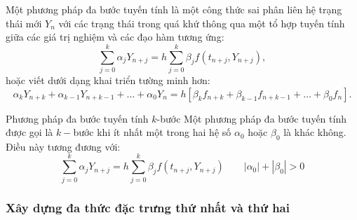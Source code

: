 Một phương pháp đa bước tuyến tính là một công thức sai phân liên hệ trạng thái mới $Y_{n}$ với các trạng thái trong quá khứ thông qua một tổ hợp tuyến tính giữa các giá trị nghiệm và các đạo hàm tương ứng:
\begin{equation}
    \sum_{j=0}^{k} \alpha_j Y_{n+j} = h \sum_{j=0}^{k} \beta_j f(t_{n+j}, Y_{n+j}), \tag{2.2} \label{eq:2.2}
\end{equation}
hoặc viết dưới dạng khai triển tường minh hơn:
\[
    \alpha_k Y_{n+k} + \alpha_{k-1} Y_{n+k-1} + \dots + \alpha_0 Y_n = h \left[ \beta_k f_{n+k} + \beta_{k-1} f_{n+k-1} + \dots + \beta_0 f_n \right].
\]

\begin{baitapbox}{Phương pháp đa bước tuyến tính $k$-bước}
    Một phương pháp đa bước tuyến tính được gọi là $k-$bước khi ít nhất một trong hai hệ số $\alpha_0$ hoặc $\beta_0$ là khác không. Điều này tương đương với:
    \[
    \sum_{j=0}^{k} \alpha_j Y_{n+j} = h \sum_{j=0}^{k} \beta_j f(t_{n+j}, Y_{n+j}) \qquad |\alpha_0| + |\beta_0| > 0
    \]
\end{baitapbox}

\vspace{0.5em}


\subsubsection{Xây dựng đa thức đặc trưng thứ nhất và thứ hai}

